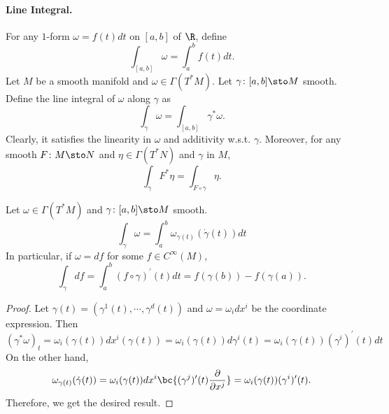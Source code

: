 \paragraph{Line Integral.} For any $1$-form $\omega = f(t)dt$ on $[a,b]$ of $\R$, define
\begin{equation*}
    \int_{[a,b]}\omega = \int_a^b f(t)dt.
\end{equation*}
Let $M$ be a smooth manifold and $\omega \in \Gamma(T^*M)$. Let $\gamma \colon [a,b] \sto M$ smooth. Define the line integral of $\omega$ along $\gamma$ as
\begin{equation*}
    \int_\gamma \omega = \int_{[a,b]}\gamma^*\omega.
\end{equation*}
Clearly, it satisfies the linearity in $\omega$ and additivity w.s.t. $\gamma$. Moreover, for any smooth $F \colon M \sto N$ and $\eta \in \Gamma(T^*N)$ and $\gamma$ in $M$,
\begin{equation*}
    \int_\gamma F^*\eta = \int_{F \circ \gamma} \eta.
\end{equation*}
\begin{prop}
    Let $\omega \in \Gamma(T^*M)$ and $\gamma \colon [a,b] \sto M$ smooth.
    \begin{equation*}
        \int_\gamma \omega = \int_a^b \omega_{\gamma(t)}(\dot{\gamma}(t))dt
    \end{equation*}
    In particular, if $\omega = df$ for some $f \in C^\infty(M)$,
    \begin{equation*}
        \int_\gamma df = \int_a^b (f \circ \gamma)^\prime(t)dt = f(\gamma(b)) - f(\gamma(a)).
    \end{equation*}
\end{prop}
\begin{proof}
    Let $\gamma(t) = (\gamma^1(t),\cdots, \gamma^d(t))$ and $\omega = \omega_i dx^i$ be the coordinate expression. Then
    \begin{equation*}
        (\gamma^* \omega)_t = \omega_i(\gamma(t)) d x^i(\gamma(t)) = \omega_i(\gamma(t)) d \gamma^i(t) = \omega_i(\gamma(t))(\gamma^i)^\prime(t)dt
    \end{equation*}
    On the other hand,
    \begin{equation*}
        \omega_{\gamma(t)}(\dot{\gamma}(t)) = \omega_i(\gamma(t)) d x^i \bc{(\gamma^j)^\prime(t) \frac{\partial}{\partial x^j}} = \omega_i(\gamma(t))(\gamma^i)^\prime(t).
    \end{equation*}
    Therefore, we get the desired result.
\end{proof}


